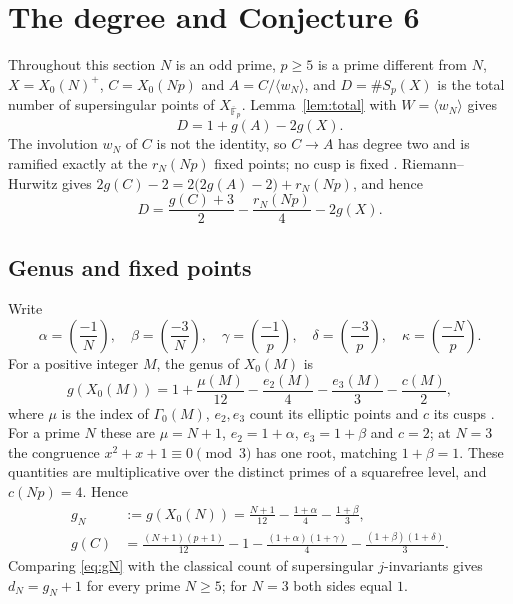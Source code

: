 \documentclass[11pt,a4paper]{article}
\theoremstyle{remark}\newtheorem{remark}[theorem]{Remark}
\numberwithin{equation}{section}
\newcommand{\kk}{\overline{\mathbb F}_p}
\newcommand{\leg}[2]{\left(\frac{#1}{#2}\right)}
\begin{document}
	\section{The degree and Conjecture 6}\label{sec:degree}
	Throughout this section $N$ is an odd prime, $p\geq5$ is a prime different from $N$, $X=X_0(N)^+$, $C=X_0(Np)$ and $A=C/\langle w_N\rangle$, and $D=\#S_p(X)$ is the total number of supersingular points of $X_{\kk}$. Lemma~\ref{lem:total} with $W=\langle w_N\rangle$ gives
	\begin{equation}\label{eq:Dtotal}
		D=1+g(A)-2g(X).
	\end{equation}
	The involution $w_N$ of $C$ is not the identity, so $C\to A$ has degree two and is ramified exactly at the $r_N(Np)$ fixed points; no cusp is fixed \cite[Proposition 3]{Ogg}. Riemann--Hurwitz gives $2g(C)-2=2\bigl(2g(A)-2\bigr)+r_N(Np)$, and hence
	\begin{equation}\label{eq:RH}
		D=\frac{g(C)+3}{2}-\frac{r_N(Np)}{4}-2g(X).
	\end{equation}
	
	\subsection{Genus and fixed points}
	Write
	\[
	\alpha=\leg{-1}{N},\quad\beta=\leg{-3}{N},\quad\gamma=\leg{-1}{p},\quad\delta=\leg{-3}{p},\quad\kappa=\leg{-N}{p}.
	\]
	For a positive integer $M$, the genus of $X_0(M)$ is
	\[
	g(X_0(M))=1+\frac{\mu(M)}{12}-\frac{e_2(M)}4-\frac{e_3(M)}3-\frac{c(M)}2,
	\]
	where $\mu$ is the index of $\Gamma_0(M)$, $e_2,e_3$ count its elliptic points and $c$ its cusps \cite[Theorem 3.1.1 and Section 3.9]{DS}. For a prime $N$ these are $\mu=N+1$, $e_2=1+\alpha$, $e_3=1+\beta$ and $c=2$; at $N=3$ the congruence $x^2+x+1\equiv0\pmod 3$ has one root, matching $1+\beta=1$. These quantities are multiplicative over the distinct primes of a squarefree level, and $c(Np)=4$. Hence
	\begin{align}
		g_N&:=g(X_0(N))=\frac{N+1}{12}-\frac{1+\alpha}4-\frac{1+\beta}3,\label{eq:gN}\\
		g(C)&=\frac{(N+1)(p+1)}{12}-1-\frac{(1+\alpha)(1+\gamma)}4-\frac{(1+\beta)(1+\delta)}3.\label{eq:gC}
	\end{align}
	Comparing \eqref{eq:gN} with the classical count of supersingular $j$-invariants \cite[Theorem V.4.1(c)]{Sil} gives $d_N=g_N+1$ for every prime $N\geq5$; for $N=3$ both sides equal $1$.
	
\end{document}
